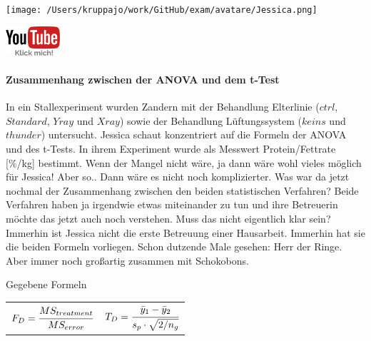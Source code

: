 \documentclass[a4paper, 9pt]{scrartcl}\usepackage[]{graphicx}\usepackage[]{xcolor}
\begin{document}
 
\ifcollection
\begin{flushright}
\tiny\vspace{-3Ex}
\textbf{\examinhaltstart}
\exammodulebiostat
\vspace{-4Ex}
\end{flushright}
\begin{minipage}[t]{0.5\textwidth}
\texttt{[image: /Users/kruppajo/work/GitHub/exam/avatare/Jessica.png]}
\end{minipage}
\begin{minipage}[t]{0.5\textwidth}
\hfill
\href{https://youtu.be/FjjJXkFJfIY}{\includegraphics[width = 2cm]{img/youtube}}
\end{minipage}
\vspace{-3Ex}
\fi



\ifcollection
\paragraph{Zusammenhang zwischen der ANOVA und dem t-Test}
\fi

In ein Stallexperiment wurden Zandern mit der Behandlung Elterlinie ($ctrl$, $Standard$, $Yray$ und $Xray$) sowie der Behandlung Lüftungssystem ($keins$ und $thunder$) untersucht. Jessica schaut konzentriert auf die Formeln der ANOVA und des t-Tests. In ihrem Experiment wurde als Messwert Protein/Fettrate [\%/kg] bestimmt. Wenn der Mangel nicht wäre, ja dann wäre wohl vieles möglich für Jessica! Aber so.. Dann wäre es nicht noch komplizierter. Was war da jetzt nochmal der Zusammenhang zwischen den beiden statistischen Verfahren? Beide Verfahren haben ja irgendwie etwas miteinander zu tun und ihre Betreuerin möchte das jetzt auch noch verstehen. Muss das nicht eigentlich klar sein? Immerhin ist Jessica nicht die erste Betreuung einer Hausarbeit. Immerhin hat sie die beiden Formeln vorliegen. Schon dutzende Male gesehen: Herr der Ringe. Aber immer noch großartig zusammen mit Schokobons.

\begin{graybox}{Gegebene Formeln}
\begin{center}
  \begin{tabular}{cc}
    $F_{D} = \cfrac{MS_{treatment}}{MS_{error}}$ & $T_{D} = \cfrac{\bar{y}_1 - \bar{y}_2}{s_p \cdot \sqrt{2/n_g}}$\\
  \end{tabular}
\end{center}
\end{graybox}
\end{document}
